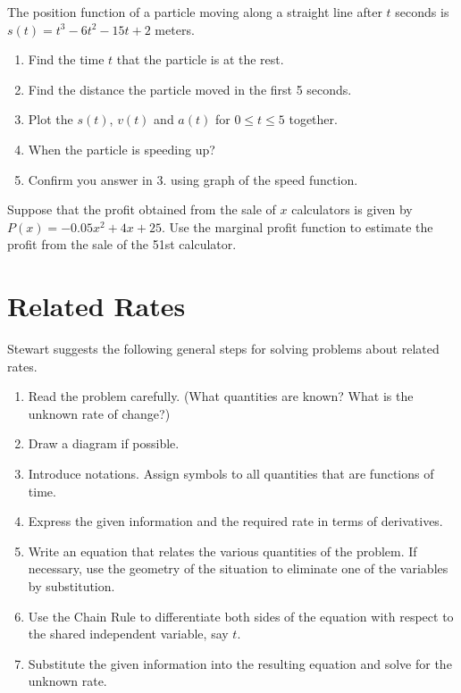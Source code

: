 \documentclass[en,11pt,simple]{elegantbook}
\let\BeginKnitrBlock\begin \let\EndKnitrBlock\end
\begin{document}
\BeginKnitrBlock{exercise}{}{}
\protect\hypertarget{exr:unnamed-chunk-73}{}{\label{exr:unnamed-chunk-73} }
The position function of a particle moving along a straight line after \(t\) seconds is \(s(t) = t^3 - 6t^2 - 15t+2\) meters.

\begin{enumerate}
\def\labelenumi{\arabic{enumi}.}

\item
  Find the time \(t\) that the particle is at the rest.
\item
  Find the distance the particle moved in the first 5 seconds.
\item
  Plot the \(s(t)\), \(v(t)\) and \(a(t)\) for \(0\le t\le 5\) together.
\item
  When the particle is speeding up?
\item
  Confirm you answer in 3. using graph of the speed function.
\end{enumerate}
\EndKnitrBlock{exercise}

\BeginKnitrBlock{exercise}{}{}
\protect\hypertarget{exr:unnamed-chunk-74}{}{\label{exr:unnamed-chunk-74} }
Suppose that the profit obtained from the sale of \(x\) calculators is given by \(P(x)=-0.05x^2+4x+25\). Use the marginal profit function to estimate the profit from the sale of the 51st calculator.
\EndKnitrBlock{exercise}

\hypertarget{related-rates}{%
\section{Related Rates}\label{related-rates}}

Stewart suggests the following general steps for solving problems about related rates.

\begin{enumerate}
\def\labelenumi{\arabic{enumi}.}

\item
  Read the problem carefully. (What quantities are known? What is the unknown rate of change?)
\item
  Draw a diagram if possible.
\item
  Introduce notations. Assign symbols to all quantities that are functions of time.
\item
  Express the given information and the required rate in terms of derivatives.
\item
  Write an equation that relates the various quantities of the problem. If necessary, use the geometry of the situation to eliminate one of the variables by substitution.
\item
  Use the Chain Rule to differentiate both sides of the equation with respect to the shared independent variable, say \(t\).
\item
  Substitute the given information into the resulting equation and solve for the unknown rate.
\end{enumerate}
\end{document}

